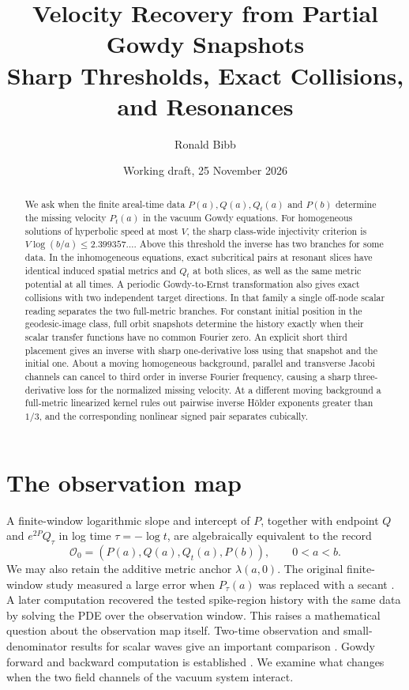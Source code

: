 \documentclass[11pt]{article}
\title{Velocity Recovery from Partial Gowdy Snapshots\protect\\
Sharp Thresholds, Exact Collisions, and Resonances}
\author{Ronald Bibb}
\date{Working draft, 25 November 2026}
\begin{document}
\maketitle

\begin{abstract}
We ask when the finite areal-time data
$P(a),Q(a),Q_t(a)$ and $P(b)$ determine the missing
velocity $P_t(a)$ in the vacuum Gowdy equations.
For homogeneous solutions of hyperbolic speed at most $V$,
the sharp class-wide injectivity criterion is
$V\log(b/a)\leq 2.399357\ldots$.
Above this threshold the inverse has two branches for some data.
In the inhomogeneous equations, exact subcritical pairs at
resonant slices have identical induced spatial metrics and
$Q_t$ at both slices, as well as the same metric potential
at all times. A periodic Gowdy-to-Ernst transformation also gives
exact collisions with two independent target directions.
In that family a single off-node scalar reading separates
the two full-metric branches.
For constant initial position in the
geodesic-image class, full orbit snapshots determine the
history exactly when their scalar transfer functions have no
common Fourier zero. An explicit short third placement gives
an inverse with sharp one-derivative loss using that snapshot
and the initial one.
About a moving homogeneous background, parallel and transverse
Jacobi channels can cancel to third order in inverse Fourier
frequency, causing a sharp three-derivative loss for the
normalized missing velocity. At a different moving background a
full-metric linearized kernel rules out pairwise inverse
H\"older exponents greater than $1/3$, and the corresponding
nonlinear signed pair separates cubically.
\end{abstract}

\section{The observation map}
A finite-window logarithmic slope and intercept of $P$, together
with endpoint $Q$ and $e^{2P}Q_\tau$ in log time $\tau=-\log t$,
are algebraically equivalent to the record
\[
 \mathcal O_0=(P(a),Q(a),Q_t(a),P(b)),\qquad 0<a<b.
\]
We may also retain the additive metric anchor $\lambda(a,0)$.
The original finite-window study measured a large error when
$P_\tau(a)$ was replaced with a secant \cite{old}.
A later computation recovered the tested spike-region history with
the same data by solving the PDE over the observation window.
This raises a mathematical question about the observation map itself.
Two-time observation and small-denominator results for scalar waves
give an important comparison \cite{vest,cssw}. Gowdy forward and
backward computation is established \cite{amorim}. We examine what
changes when the two field channels of the vacuum system interact.
\end{document}
